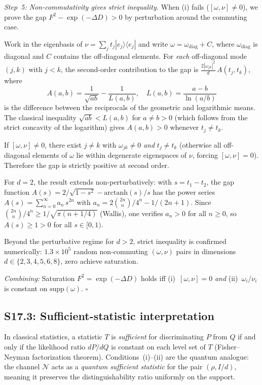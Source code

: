 \documentclass[prl,twocolumn,superscriptaddress,longbibliography]{revtex4-2}
\newcommand{\chan}{\mathcal{N}}
\newcommand{\ket}[1]{|#1\rangle}
\newcommand{\bra}[1]{\langle#1|}
\begin{document}
\emph{Step~5: Non-commutativity gives strict inequality.}
When (i) fails ($[\omega,\nu] \neq 0$), we prove the gap
$F^2 - \exp(-\Delta D) > 0$ by perturbation around the
commuting case.

Work in the eigenbasis of $\nu = \sum_j t_j \ket{e_j}\!\bra{e_j}$
and write $\omega = \omega_{\mathrm{diag}} + C$,
where $\omega_{\mathrm{diag}}$ is diagonal and
$C$ contains the off-diagonal elements.
For \emph{each} off-diagonal mode $(j,k)$ with $j < k$,
the second-order contribution to the gap is
$\tfrac{2|\omega_{jk}|^2}{d}\,A(t_j, t_k)$,
where
\begin{equation}
A(a,b) = \frac{1}{\sqrt{ab}} - \frac{1}{L(a,b)},
\quad L(a,b) = \frac{a - b}{\ln(a/b)}
\label{eq:gap_coeff}
\end{equation}
is the difference between the reciprocals of the geometric
and logarithmic means.
The classical inequality $\sqrt{ab} < L(a,b)$ for $a \neq b > 0$
(which follows from the strict concavity of the logarithm)
gives $A(a,b) > 0$ whenever $t_j \neq t_k$.

If $[\omega,\nu] \neq 0$, there exist $j \neq k$ with
$\omega_{jk} \neq 0$ \emph{and} $t_j \neq t_k$
(otherwise all off-diagonal elements of $\omega$ lie within
degenerate eigenspaces of $\nu$, forcing
$[\omega,\nu] = 0$).  Therefore the gap is strictly positive
at second order.

For $d = 2$, the result extends non-perturbatively:
with $s = t_1 - t_2$, the gap function
$A(s) = 2/\sqrt{1-s^2} - \mathrm{arctanh}(s)/s$
has the power series $A(s) = \sum_{n=0}^{\infty} a_n\, s^{2n}$
with $a_n = 2\binom{2n}{n}/4^n - 1/(2n+1)$.
Since $\binom{2n}{n}/4^n \geq 1/\sqrt{\pi(n+1/4)}$
(Wallis), one verifies $a_n > 0$ for all $n \geq 0$,
so $A(s) \geq 1 > 0$ for all $s \in [0,1)$.

Beyond the perturbative regime for $d > 2$,
strict inequality is confirmed numerically:
$1.3\times 10^5$ random non-commuting $(\omega,\nu)$ pairs in
dimensions $d \in \{2,3,4,5,6,8\}$, zero achieve saturation.

\emph{Combining:} Saturation $F^2 = \exp(-\Delta D)$ holds iff
(i)~$[\omega,\nu] = 0$ \emph{and} (ii)~$\omega_i/\nu_i$ is
constant on $\mathrm{supp}(\omega)$. \hfill$\square$

\subsection{S17.3: Sufficient-statistic interpretation}

In classical statistics, a statistic $T$ is \emph{sufficient} for
discriminating $P$ from $Q$ if and only if the likelihood ratio
$dP/dQ$ is constant on each level set of $T$
(Fisher--Neyman factorization theorem).
Conditions~(i)--(ii) are the quantum analogue: the channel
$\chan$ acts as a \emph{quantum sufficient statistic} for the
pair $(\rho, I/d)$, meaning it preserves the distinguishability
ratio uniformly on the support.
\end{document}
